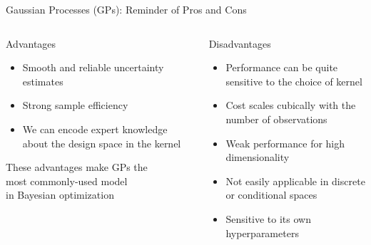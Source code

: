 \begin{frame}[c]{Gaussian Processes (GPs): Reminder of Pros and Cons}

\begin{columns}[T] %
\begin{column}{.48\textwidth}

    \begin{block}{Advantages}
    \begin{itemize}
    	\item Smooth and reliable uncertainty estimates 
		\item Strong sample efficiency
    	\item We can encode expert knowledge about the design space in the kernel 
    \end{itemize}
    \end{block}
\bigskip
\fhpause
\hspace*{0.5cm}These advantages make GPs the\\
\hspace*{0.5cm}\alert{most commonly-used model\\
\hspace*{0.5cm}in Bayesian optimization}

\end{column}%

\hfill%
\fhpause

\begin{column}{.48\textwidth}
    \begin{block}{Disadvantages}
    \begin{itemize}
    	\item Performance can be quite sensitive to the choice of kernel
    	\item Cost scales cubically with the number of observations 
    	\item Weak performance for high dimensionality
    	\item Not easily applicable in discrete or conditional spaces 
    	\item Sensitive to its own hyperparameters
    \end{itemize}
\end{block}

\end{column}
\end{columns}

	

\end{frame}
